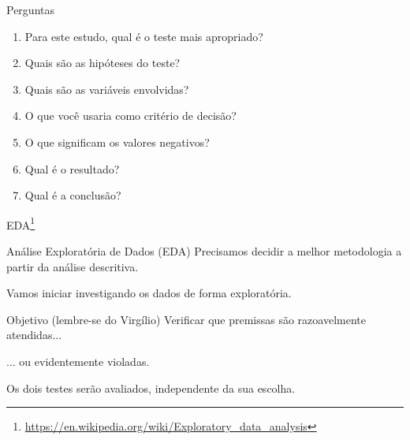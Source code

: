 \documentclass{beamer}
\begin{document}
\begin{frame}[label=perguntas]{\scriptsize Perguntas}
  \begin{enumerate}
    \footnotesize
  \item Para este estudo, qual é o teste mais apropriado?
  \item Quais são as hipóteses do teste?
  \item Quais são as variáveis envolvidas?
  \item O que você usaria como critério de decisão?
  \item O que significam os valores negativos?
  \item Qual é o resultado?
  \item Qual é a conclusão?
  \end{enumerate}
\end{frame}

\begin{frame}{\scriptsize EDA\footnote{\tiny \url{https://en.wikipedia.org/wiki/Exploratory_data_analysis}}}
  \begin{block}{Análise Exploratória de Dados (EDA)}
    \footnotesize
    Precisamos decidir a melhor metodologia a partir da análise descritiva.

    \bigskip
    Vamos iniciar investigando os dados de forma exploratória.
  \end{block}
  \vfill
  \begin{block}{Objetivo (lembre-se do Virgílio)}
    Verificar que premissas são razoavelmente atendidas...

    \bigskip
    ... ou evidentemente violadas.
  \end{block}
\end{frame}

\begin{frame}{\scriptsize }
  \begin{center}
    {\LARGE

      Os dois testes serão avaliados, independente da sua escolha.

    }
  \end{center}
  \vfill
\end{frame}
\end{document}
